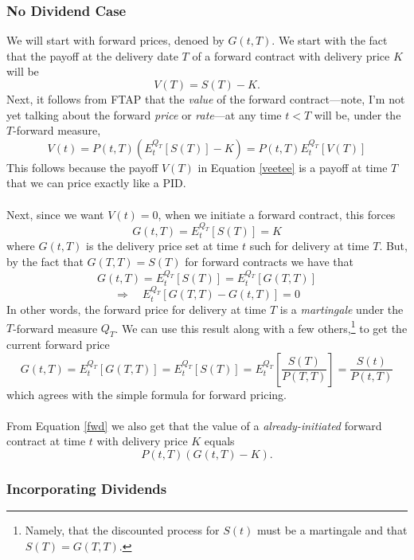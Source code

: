 \documentclass[12pt]{article}
\theoremstyle{plain}
\theoremstyle{definition}
\theoremstyle{remark}
\begin{document}
\subsubsection{No Dividend Case}

We will start with forward prices, denoed by $G(t,T)$.  We start with
the fact that the payoff at the delivery date $T$ of a forward contract
with delivery price $K$ will be
\begin{equation}
   \label{veetee}
    V(T) = S(T) - K.
\end{equation}
Next, it follows from FTAP that the \emph{value} of the forward 
contract---note, I'm not yet talking about the forward \emph{price} or
\emph{rate}---at
any time $t<T$ will be, under the $T$-forward measure,
\begin{equation}
   \label{fwd}
   V(t)  = P(t,T) \left( E_t^{Q_T}[S(T)] - K  \right) = P(t,T)
      E_t^{Q_T}[V(T)]
\end{equation}
This follows because the payoff $V(T)$ in Equation \ref{veetee} 
is a payoff at time $T$ that we can price exactly like a PID.
\\
\\
Next, since we want $V(t) = 0$, when we initiate a forward contract, 
this forces
   \[ G(t,T) = E_t^{Q_T}[S(T)] = K \]
where $G(t,T)$ is the delivery price set at time $t$ such for delivery
at time $T$. But, by the fact that $G(T,T) = S(T)$ for forward contracts
we have that
   \[ G(t,T) = E_t^{Q_T}[S(T)] = E_t^{Q_T}[G(T,T)] \]
   \[ \Rightarrow \quad E_t^{Q_T}[G(T,T)-G(t,T)] = 0 \]
In other words, the forward price for delivery at time $T$ is a 
\emph{martingale} under the $T$-forward measure $Q_T$. We can use
this result along with a few others,\footnote{Namely, that the
   discounted process for $S(t)$ must be a martingale and that
   $S(T) = G(T,T)$.} 
   to get the current forward price
   \[ G(t,T) = E_t^{Q_T}[G(T,T)] = E_t^{Q_T}[S(T)] 
      = E_t^{Q_T}\left[\frac{S(T)}{P(T,T)} \right] 
      = \frac{S(t)}{P(t,T)} \]
which agrees with the simple formula for forward pricing.
\\
\\
From Equation \ref{fwd} we also get that the value of a 
\emph{already-initiated} forward contract at time $t$ with 
delivery price $K$ equals
   \[ P(t,T)(G(t,T) - K).\]

\subsubsection{Incorporating Dividends}
\end{document}
